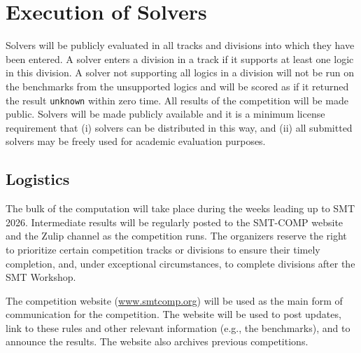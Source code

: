 \documentclass[12pt]{article}
\begin{document}

\section{Execution of Solvers}

Solvers will be publicly evaluated in all tracks and divisions into
which they have been entered.
%
A solver enters a division in a track if it supports at least one
logic in this division.
%
A solver not supporting all logics in a division will not be run on
the benchmarks from the unsupported logics and will be scored as if it
returned the result \texttt{unknown} within zero time.
%
All results of the competition will be made public. Solvers will be
made publicly available and it is a minimum
license requirement that (i) solvers can be distributed in this way,
and (ii) all submitted solvers may be freely used for academic
evaluation purposes.



\subsection{Logistics}
\label{sec:logistics}

%
The bulk of the computation will take place during the weeks leading
up to SMT 2026.  Intermediate results will be regularly posted to the
SMT-COMP website and the Zulip channel as the competition runs.
%
The organizers reserve the right to prioritize certain competition
tracks or divisions to ensure their timely completion, and, under
exceptional circumstances, to complete divisions after the SMT
Workshop.

The competition website (\url{www.smtcomp.org}) will be used as the main form
of communication for the competition. The website will be used to post updates,
link to these rules and other relevant information (e.g., the benchmarks), and
to announce the results. The website also archives previous
competitions.
%
\end{document}

